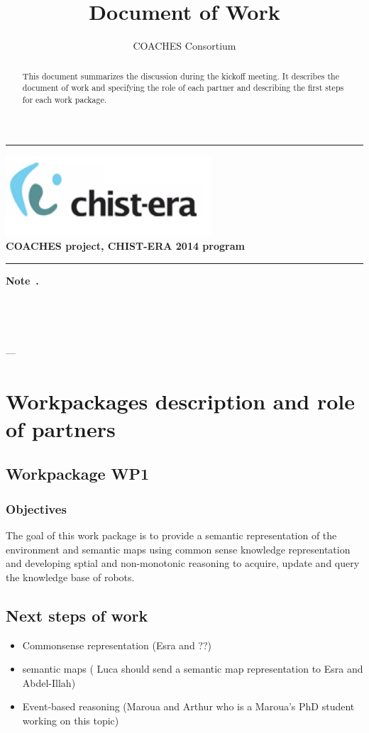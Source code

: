 \documentclass{article}
\title{ Document of Work }
\author{COACHES Consortium}
\date{}
\newcommand{\makemadtitle}{
  \hrule
  \vspace{.5em}
  \noindent
  \begin{center}
  \textbf{
  {\centering\includegraphics[height=3cm,bb=0 0 371 145]{../fig/logoCHISTERA2014.png}}\\
   {\centering\Large COACHES project, CHIST-ERA 2014 program}
  }
  \end{center}
  \vspace{.5em}
 
  \hrule
  \vspace{3em}
  \begin{center}
    \begin{large}\textbf{ Note~\usebox{\notenumber}.}\end{large}\\[.5em]
    \begin{Large}\textbf{\usebox{\notetitle}}\end{Large}\\[2em]
    \begin{large}\usebox{\noteauthor} --- \usebox{\notedate}\end{large}
  \end{center}
  \vspace{3em}
}
\begin{document}
\makemadtitle

\vspace*{1.0in}
\begin{abstract}
 This document summarizes the discussion during the kickoff meeting. It describes the document of work and specifying the role of each partner and describing the first steps for each work package.
  \end{abstract}

\vspace*{1.5in}

\newpage

\section{Workpackages description and role of partners}
\subsection{Workpackage WP1}
\subsubsection*{Objectives}
The goal of this work package is to provide a semantic representation of the environment and semantic maps using common sense knowledge representation and developing sptial and non-monotonic reasoning to acquire, update and query the knowledge base of robots. 
\subsection*{Next steps of work}
\begin{itemize}
\item Commonsense representation (Esra and ??)
\item semantic maps ( Luca should send a semantic map representation to Esra and Abdel-Illah)
\item Event-based reasoning (Maroua and Arthur who is a Maroua's PhD student working on this topic)
\end{itemize}
\end{document}
